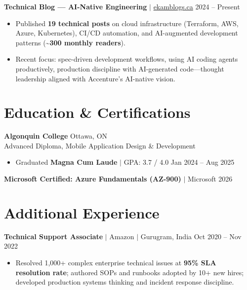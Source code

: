 \documentclass[11pt,a4paper]{article}
\begin{document}
\vspace{4pt}

\textbf{Technical Blog — AI-Native Engineering} $|$ \href{https://www.ekamblogs.ca}{ekamblogs.ca} \hfill 2024 -- Present
\begin{itemize}
    \item Published \textbf{19 technical posts} on cloud infrastructure (Terraform, AWS, Azure, Kubernetes), CI/CD automation, and AI-augmented development patterns (\textasciitilde\textbf{300 monthly readers}).
    \item Recent focus: spec-driven development workflows, using AI coding agents productively, production discipline with AI-generated code—thought leadership aligned with Accenture's AI-native vision.
\end{itemize}

\section{Education \& Certifications}

\textbf{Algonquin College} \hfill Ottawa, ON \\
Advanced Diploma, Mobile Application Design \& Development
\begin{itemize}
    \item Graduated \textbf{Magna Cum Laude} $|$ GPA: 3.7 / 4.0 \hfill Jan 2024 -- Aug 2025
\end{itemize}
\textbf{Microsoft Certified: Azure Fundamentals (AZ-900)} $|$ Microsoft \hfill 2026

\section{Additional Experience}

\textbf{Technical Support Associate} $|$ Amazon $|$ Gurugram, India \hfill Oct 2020 -- Nov 2022
\begin{itemize}
    \item Resolved 1,000+ complex enterprise technical issues at \textbf{95\% SLA resolution rate}; authored SOPs and runbooks adopted by 10+ new hires; developed production systems thinking and incident response discipline.
\end{itemize}
\end{document}
